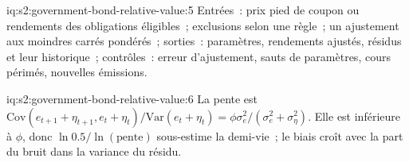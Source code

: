 \begin{solution}{iq:s2:government-bond-relative-value:5}
Entrées~: prix pied de coupon ou rendements des obligations éligibles~; exclusions selon une règle~; un ajustement aux moindres carrés pondérés~; sorties~: paramètres, rendements ajustés, résidus
et leur historique~; contrôles~: erreur d'ajustement, sauts de paramètres, cours périmés, nouvelles émissions.
\end{solution}

\begin{solution}{iq:s2:government-bond-relative-value:6}
La pente est $\mathrm{Cov}(e_{t+1} + \eta_{t+1}, e_t + \eta_t)/\mathrm{Var}(e_t + \eta_t) = \phi\sigma_e^2/(\sigma_e^2 + \sigma_\eta^2)$. Elle est inférieure
à $\phi$, donc $\ln 0.5/\ln(\text{pente})$ sous-estime la demi-vie~; le biais croît avec la part du bruit dans la variance du résidu.
\end{solution}
